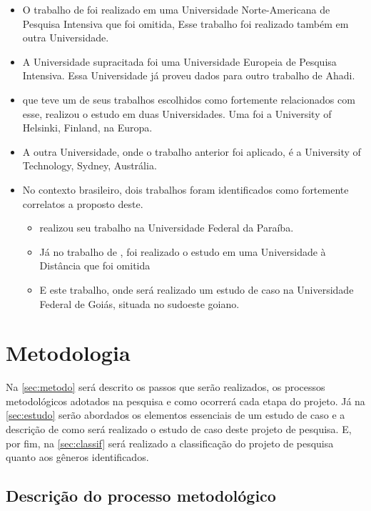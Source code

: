 \documentclass[
	12pt,				%
	openright,			%
	oneside,
	a4paper,			%
	english,			%
	french,				%
	spanish,			%
	brazil,				%
	]{abntex2}
\begin{document}
\begin{itemize}
    \item O trabalho de  foi realizado em uma Universidade Norte-Americana de Pesquisa Intensiva que foi omitida, Esse trabalho foi realizado também em outra Universidade.
    \item A Universidade supracitada foi uma Universidade Europeia de Pesquisa Intensiva. Essa Universidade já proveu dados para outro trabalho de Ahadi.
    \item {} que teve um de seus trabalhos escolhidos como fortemente relacionados com esse, realizou o estudo em duas Universidades. Uma foi a University of Helsinki, Finland, na Europa.
    \item A outra Universidade, onde o trabalho anterior foi aplicado, é a University of Technology, Sydney, Austrália.
    \item No contexto brasileiro, dois trabalhos foram identificados como fortemente correlatos a proposto deste.
        \begin{itemize}
            \item {} realizou seu trabalho na Universidade Federal da Paraíba.
            \item Já no trabalho de , foi realizado o estudo em uma Universidade à Distância que foi omitida
            \item E este trabalho, onde será realizado um estudo de caso na Universidade Federal de Goiás, situada no sudoeste goiano.
    \end{itemize}
\end{itemize}


\chapter{Metodologia}

Na \autoref{sec:metodo} será descrito os passos que serão realizados, os processos metodológicos adotados na pesquisa e como ocorrerá cada etapa do projeto. Já na \autoref{sec:estudo} serão abordados os elementos essenciais de um estudo de caso e a descrição de como será realizado o estudo de caso deste projeto de pesquisa. E, por fim, na \autoref{sec:classif} será realizado a classificação do projeto de pesquisa quanto aos gêneros identificados.

\section{Descrição do processo metodológico} \label{sec:metodo}
\end{document}
